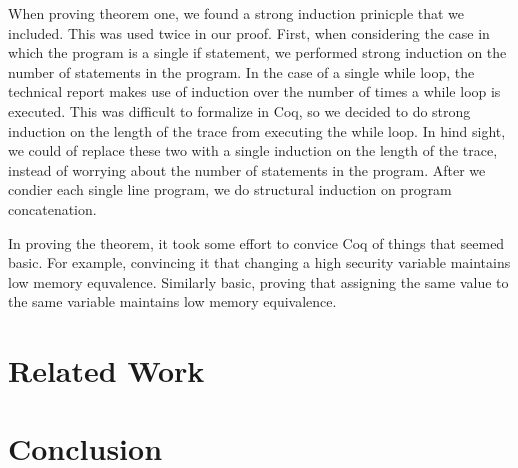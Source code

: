 \documentclass[10pt,  onecolumn]{article}
\begin{document}
When proving theorem one, we found a strong induction prinicple that we included. \cite{strongind}
This was used twice in our proof. 
First, when considering the case in which the program is a single if statement, we performed strong induction on the number of statements in the program. 
In the case of a single while loop, the technical report makes use of induction over the number of times a while loop is executed. 
This was difficult to formalize in Coq, so we decided to do strong induction on the length of the trace from executing the while loop. 
In hind sight, we could of replace these two with a single induction on the length of the trace, instead of worrying about the number of statements in the program.
After we condier each single line program, we do structural induction on program concatenation.

In proving the theorem, it took some effort to convice Coq of things that seemed basic.  For example, convincing it that changing a high security variable maintains low memory equvalence.
Similarly basic, proving that assigning the same value to the same variable maintains low memory equivalence.












%
%

\section{Related Work}
\label{sec:relatedwork}

\section{Conclusion}
\label{sec:conclusion}
\end{document}
